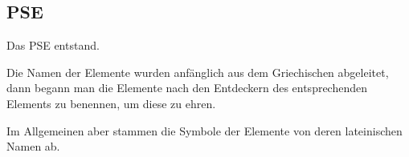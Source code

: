 \subsection{\acf{PSE}}
Das \acf{PSE} entstand.

Die Namen der Elemente wurden anfänglich aus dem Griechischen abgeleitet, dann begann man die Elemente nach den Entdeckern des
entsprechenden Elements zu benennen, um diese zu ehren.

Im Allgemeinen aber stammen die Symbole der Elemente von deren lateinischen Namen ab.
